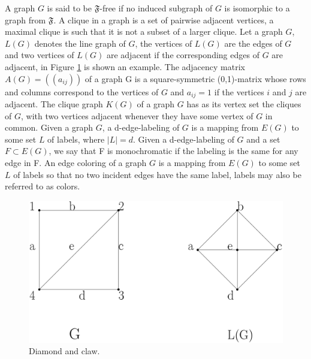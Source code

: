 \documentclass[12pt,a4paper,titlepage,openany]{report}
\begin{document}
A graph $G$ is said to be $\mathfrak{F}$-free if no induced subgraph of $G$ is isomorphic to a graph from $\mathfrak{F}$. A clique in a graph is a set of pairwise adjacent vertices, a maximal clique is such that it is not a subset of a larger clique. Let a graph $G$, $L(G)$ denotes the line graph of $G$, the vertices of $L(G)$ are the edges of $G$ and two vertices of $L(G)$ are adjacent if the corresponding edges of $G$ are adjacent, in Figure \ref{linegraph} is shown an example. The adjacency matrix $A(G)=((a_{ij}))$ of a graph G is a square-symmetric (0,1)-matrix whose rows and columns correspond to the vertices of $G$ and $a_{ij} = 1$ if the vertices $i$ and $j$ are adjacent. The clique graph $K(G)$ of a graph $G$ has as its vertex set the cliques of $G$, with two vertices adjacent whenever they have some vertex of $G$ in common.\newline
Given a graph $G$, a d-edge-labeling of $G$ is a mapping from $E(G)$ to some set $L$ of labels, where $|L| = d$. Given a d-edge-labeling of $G$ and a set $F \subset E(G)$,
we say that F is monochromatic if the labeling is the same for any edge in F. An edge coloring of a graph $G$ is a mapping from $E(G)$ to some set $L$ of labels so that no two incident edges have the same label, labels may also be referred to as colors.

\begin{figure}[h]
\begin{center}
\includegraphics[width=0.7\linewidth]{figures/linegraph.png}
\end{center}
\caption{Diamond and claw.}\label{linegraph}
\end{figure}
\end{document}
